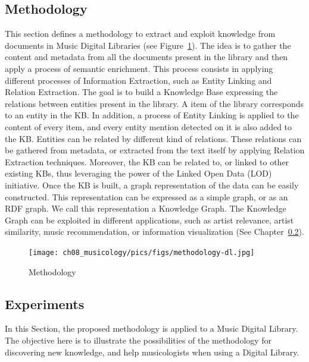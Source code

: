 \subsection{Methodology}

This section defines a methodology to extract and exploit knowledge from documents in Music Digital Libraries (see Figure~\ref{fig:methodology-dl}). The idea is to gather the content and metadata from all the documents present in the library and then apply a process of semantic enrichment. This process consists in applying different processes of Information Extraction, such as Entity Linking and Relation Extraction. The goal is to build a Knowledge Base expressing the relations between entities present in the library. %
A item of the library corresponds to an entity in the KB. In addition, a process of Entity Linking is applied to the content of every item, and every entity mention detected on it is also added to the KB. Entities can be related by different kind of relations. These relations can be gathered from metadata, or extracted from the text itself by applying Relation Extraction techniques. Moreover, the KB can be related to, or linked to other existing KBs, thus leveraging the power of the Linked Open Data (LOD) initiative. 
Once the KB is built, a graph representation of the data can be easily constructed. This representation can be expressed as a simple graph, or as an RDF graph. We call this representation a Knowledge Graph. The Knowledge Graph can be exploited in different applications, such as artist relevance, artist similarity, music recommendation, or information visualization (See Chapter~\ref{}).

\begin{figure}[!ht]
	\centering
	\texttt{[image: ch08\_musicology/pics/figs/methodology-dl.jpg]}
	\caption{Methodology
	\label{fig:methodology-dl}}
\end{figure}

\subsection{Experiments}

In this Section, the proposed methodology is applied to a Music Digital Library. The objective here is to illustrate the possibilities of the methodology for discovering new knowledge, and help musicologists when using a Digital Library.

